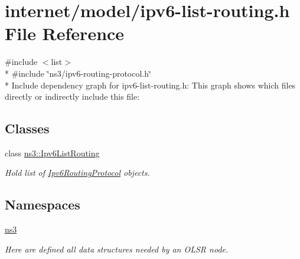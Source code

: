 \hypertarget{ipv6-list-routing_8h}{}\section{internet/model/ipv6-\/list-\/routing.h File Reference}
\label{ipv6-list-routing_8h}
{\ttfamily \#include $<$list$>$}\\*
{\ttfamily \#include \char`\"{}ns3/ipv6-\/routing-\/protocol.\+h\char`\"{}}\\*
Include dependency graph for ipv6-\/list-\/routing.h\+:
This graph shows which files directly or indirectly include this file\+:
\subsection*{Classes}
\begin{DoxyCompactItemize}
\item 
class \hyperlink{classns3_1_1Ipv6ListRouting}{ns3\+::\+Ipv6\+List\+Routing}
\begin{DoxyCompactList}\small\item\em Hold list of \hyperlink{classns3_1_1Ipv6RoutingProtocol}{Ipv6\+Routing\+Protocol} objects. \end{DoxyCompactList}\end{DoxyCompactItemize}
\subsection*{Namespaces}
\begin{DoxyCompactItemize}
\item 
 \hyperlink{namespacens3}{ns3}
\begin{DoxyCompactList}\small\item\em Here are defined all data structures needed by an O\+L\+SR node. \end{DoxyCompactList}\end{DoxyCompactItemize}
